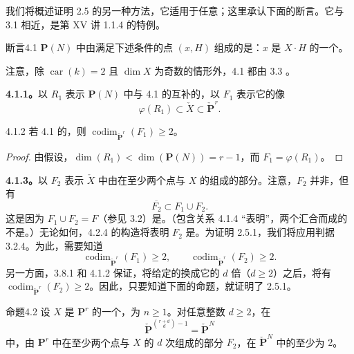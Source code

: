我们将概述证明 2.5 的另一种方法，它适用于任意；这里承认下面的断言。它与 3.1 相近，是第 XV 讲 1.1.4 的特例。

\begin{SGAresult}{断言}{4.1}
$\mathbf P(N)$ 中由满足下述条件的点 $(x,H)$ 组成的是：$x$ 是 $X\cdot H$ 的一个。
\end{SGAresult}
注意，除 $\operatorname{car}(k)=2$ 且 $\dim X$ 为奇数的情形外，4.1 都由 3.3 。

\textbf{4.1.1。}以 $R_1$ 表示 $\mathbf P(N)$ 中与 4.1 的互补的，以 $F_1$ 表示它的像
\[
\varphi(R_1)\subset\check X\subset\check{\mathbf P}^{r}.
\]
\begin{SGAresult}{}{4.1.2}
若 4.1 的，则
$\operatorname{codim}_{\check{\mathbf P}^{r}}(F_1)\geq2$。
\end{SGAresult}
\begin{proof}
由假设，$\dim(R_1)<\dim(\mathbf P(N))=r-1$，而 $F_1=\varphi(R_1)$。
\end{proof}

\textbf{4.1.3。}以 $F_2$ 表示 $\check X$ 中由在至少两个点与 $X$ 的组成的部分。注意，$F_2$ 并非，但有
\[
\overline{F_2}\subset F_1\cup F_2.
\tag{4.1.4}
\]
这是因为 $F_1\cup F_2=F$（参见 3.2）是。（包含关系 4.1.4 “表明”，两个汇合而成的不是。）无论如何，4.2.4 的构造将表明 $F_2$ 是。为证明 2.5.1，我们将应用判据 3.2.4。为此，需要知道
\[
\operatorname{codim}_{\check{\mathbf P}^{r}}(F_1)\geq2,
\qquad
\operatorname{codim}_{\check{\mathbf P}^{r}}(F_2)\geq2.
\]
另一方面，3.8.1 和 4.1.2 保证，将给定的换成它的 $d$ 倍（$d\geq2$）之后，将有
$\operatorname{codim}_{\check{\mathbf P}^{r}}(F_2)\geq2$。因此，只要知道下面的命题，就证明了 2.5.1。

\begin{SGAresult}{命题}{4.2}
设 $X$ 是 $\mathbf P^r$ 的一个，为 $n\geq1$。对任意整数 $d\geq2$，在
\[
\check{\mathbf P}^{\binom{r+d}{d}-1}=\check{\mathbf P}^{N}
\]
中，由 $\mathbf P^r$ 中在至少两个点与 $X$ 的 $d$ 次组成的部分 $F_2$，在 $\check{\mathbf P}^{N}$ 中的至少为 $2$。
\end{SGAresult}

